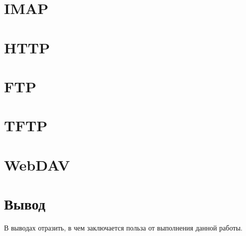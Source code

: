 \documentclass[a4paper,14pt]{extarticle}
\begin{document}
\section{IMAP}
\section{HTTP}
\section{FTP}
\section{TFTP}
\section{WebDAV}


\section{Вывод}
В выводах отразить, в чем заключается польза от выполнения данной работы.
\end{document}
